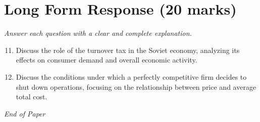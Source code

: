 \documentclass[12pt]{article}
\begin{document}
\section*{Long Form Response (20 marks)}
\textit{Answer each question with a clear and complete explanation.}
\begin{enumerate}[label=\arabic*.]
\setcounter{enumi}{10}
\item Discuss the role of the turnover tax in the Soviet economy, analyzing its effects on consumer demand and overall economic activity.
\item Discuss the conditions under which a perfectly competitive firm decides to shut down operations, focusing on the relationship between price and average total cost.
\end{enumerate}

\vfill
\noindent\textit{End of Paper}
\end{document}
